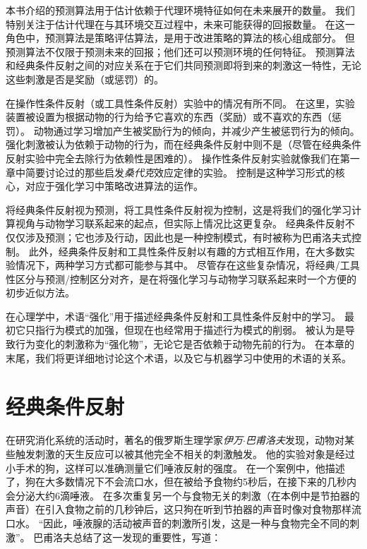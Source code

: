 本书介绍的预测算法用于估计依赖于代理环境特征如何在未来展开的数量。
我们特别关注于估计代理在与其环境交互过程中，未来可能获得的回报数量。
在这一角色中，预测算法是策略评估算法，是用于改进策略的算法的核心组成部分。
但预测算法不仅限于预测未来的回报；他们还可以预测环境的任何特征\cite{modayil2014prediction}。
预测算法和经典条件反射之间的对应关系在于它们共同预测即将到来的刺激这一特性，无论这些刺激是否是奖励（或惩罚）的。


在操作性条件反射（或工具性条件反射）实验中的情况有所不同。
在这里，实验装置被设置为根据动物的行为给予它喜欢的东西（奖励）或不喜欢的东西（惩罚）。
动物通过学习增加产生被奖励行为的倾向，并减少产生被惩罚行为的倾向。
强化刺激被认为依赖于动物的行为，而在经典条件反射中则不是（尽管在经典条件反射实验中完全去除行为依赖性是困难的）。
操作性条件反射实验就像我们在第一章中简要讨论过的那些启发\textit{桑代克}效应定律的实验。
控制是这种学习形式的核心，对应于强化学习中策略改进算法的运作。


将经典条件反射视为预测，将工具性条件反射视为控制，这是将我们的强化学习计算视角与动物学习联系起来的起点，但实际上情况比这更复杂。
经典条件反射不仅仅涉及预测；它也涉及行动，因此也是一种控制模式，有时被称为巴甫洛夫式控制。
此外，经典条件反射和工具性条件反射以有趣的方式相互作用，在大多数实验情况下，两种学习方式都可能参与其中。
尽管存在这些复杂情况，将经典/工具性区分与预测/控制区分对齐，是在将强化学习与动物学习联系起来时一个方便的初步近似方法。


在心理学中，术语“强化”用于描述经典条件反射和工具性条件反射中的学习。
最初它只指行为模式的加强，但现在也经常用于描述行为模式的削弱。
被认为是导致行为变化的刺激称为“强化物”，无论它是否依赖于动物先前的行为。
在本章的末尾，我们将更详细地讨论这个术语，以及它与机器学习中使用的术语的关系。


\section{经典条件反射} \label{sec:classical_conditioning}

在研究消化系统的活动时，著名的俄罗斯生理学家\textit{伊万$\cdot$巴甫洛夫}发现，动物对某些触发刺激的天生反应可以被其他完全不相关的刺激触发。
他的实验对象是经过小手术的狗，这样可以准确测量它们唾液反射的强度。
在一个案例中，他描述了，狗在大多数情况下不会流口水，但在被给予食物约5秒后，在接下来的几秒内会分泌大约6滴唾液。
在多次重复另一个与食物无关的刺激（在本例中是节拍器的声音）在引入食物之前的几秒钟后，这只狗在听到节拍器的声音时像对食物那样流口水。
“因此，唾液腺的活动被声音的刺激所引发，这是一种与食物完全不同的刺激”。
巴甫洛夫总结了这一发现的重要性，写道：


